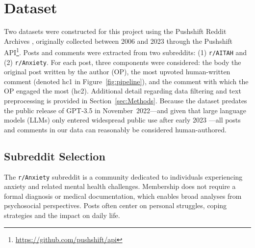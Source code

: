 


\section{Dataset}

Two datasets were constructed for this project using the Pushshift Reddit Archives \cite{pushshift}, originally collected between 2006 and 2023 through the Pushshift API\footnote{\url{https://github.com/pushshift/api}}. Posts and comments were extracted from two subreddits: (1) \texttt{r/AITAH} and (2) \texttt{r/Anxiety}. For each post, three components were considered: the body the original post written by the author (OP), the most upvoted human-written comment (denoted hc1 in Figure~\ref{fig:pipeline}), and the comment with which the OP engaged the most (hc2). Additional detail regarding data filtering and text preprocessing is provided in Section~\ref{sec:Methods}. Because the dataset predates the public release of GPT‑3.5 in November 2022—and given that large language models (LLMs) only entered widespread public use after early 2023 \cite{liang2025widespread}—all posts and comments in our data can reasonably be considered human-authored.

\subsection{Subreddit Selection}

The \texttt{r/Anxiety} subreddit is a community dedicated to individuals experiencing anxiety and related mental health challenges. Membership does not require a formal diagnosis or medical documentation, which enables broad analyses from psychosocial perspectives. Posts often center on personal struggles, coping strategies and the impact on daily life.

